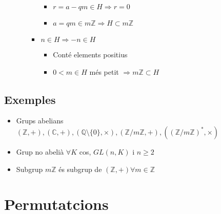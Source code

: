\documentclass{article}
\newcommand{\Z}{\mathbb{Z}}
\newcommand{\Q}{\mathbb{Q}}
\newcommand{\C}{\mathbb{C}}
\begin{document}
\begin{itemize}
\begin{itemize}
\begin{itemize}
\begin{itemize}
			\item $r = a - qm \in H \Rightarrow r = 0$
			\item $a = qm \in m\Z \Rightarrow H \subset m\Z$
			\end{itemize}
		\item $n \in H \Rightarrow -n \in H$
			\begin{itemize}
			\item Conté elements positius
			\item $0 < m \in H$ més petit $\Rightarrow m\Z \subset H$
			\end{itemize}
		\end{itemize}
	\end{itemize}
\end{itemize}

\subsection*{Exemples}
\begin{itemize}
\item Grups abelians
	\subitem $(\Z, +), (\C, +), (\Q\setminus\{0\}, \times), (\Z/m\Z, +), ((\Z/m\Z)^*, \times)$
\item Grup no abelià
	\subitem $\forall K$ cos, $GL(n, K)$ i $n \ge 2$
\item Subgrup
	\subitem $m\Z$ és subgrup de $(\Z, +) \forall m \in \Z$
\end{itemize}


\section{Permutatcions}
\end{document}
